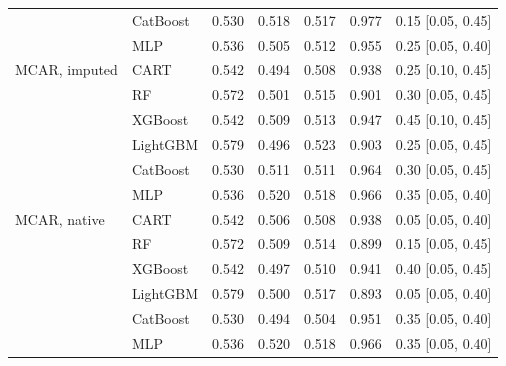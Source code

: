 \begin{table}[p]
\begin{tabular}{@{}llrrrrl@{}}
 & CatBoost & 0.530 & 0.518 & 0.517 & 0.977 & 0.15 [0.05, 0.45] \\
 & MLP & 0.536 & 0.505 & 0.512 & 0.955 & 0.25 [0.05, 0.40] \\
\midrule
MCAR, imputed & CART & 0.542 & 0.494 & 0.508 & 0.938 & 0.25 [0.10, 0.45] \\
 & RF & 0.572 & 0.501 & 0.515 & 0.901 & 0.30 [0.05, 0.45] \\
 & XGBoost & 0.542 & 0.509 & 0.513 & 0.947 & 0.45 [0.10, 0.45] \\
 & LightGBM & 0.579 & 0.496 & 0.523 & 0.903 & 0.25 [0.05, 0.45] \\
 & CatBoost & 0.530 & 0.511 & 0.511 & 0.964 & 0.30 [0.05, 0.45] \\
 & MLP & 0.536 & 0.520 & 0.518 & 0.966 & 0.35 [0.05, 0.40] \\
\midrule
MCAR, native & CART & 0.542 & 0.506 & 0.508 & 0.938 & 0.05 [0.05, 0.40] \\
 & RF & 0.572 & 0.509 & 0.514 & 0.899 & 0.15 [0.05, 0.45] \\
 & XGBoost & 0.542 & 0.497 & 0.510 & 0.941 & 0.40 [0.05, 0.45] \\
 & LightGBM & 0.579 & 0.500 & 0.517 & 0.893 & 0.05 [0.05, 0.40] \\
 & CatBoost & 0.530 & 0.494 & 0.504 & 0.951 & 0.35 [0.05, 0.40] \\
 & MLP & 0.536 & 0.520 & 0.518 & 0.966 & 0.35 [0.05, 0.40] \\
\bottomrule
\end{tabular}
\end{table}

